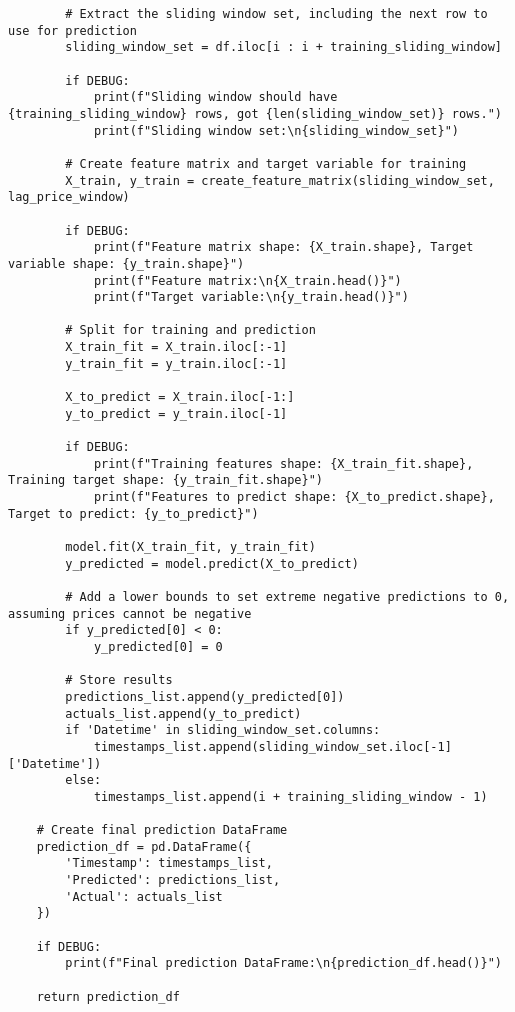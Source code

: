 \documentclass[12pt]{report} %
\begin{document}
\begin{lstlisting}
        # Extract the sliding window set, including the next row to use for prediction
        sliding_window_set = df.iloc[i : i + training_sliding_window]

        if DEBUG:
            print(f"Sliding window should have {training_sliding_window} rows, got {len(sliding_window_set)} rows.")
            print(f"Sliding window set:\n{sliding_window_set}")
        
        # Create feature matrix and target variable for training
        X_train, y_train = create_feature_matrix(sliding_window_set, lag_price_window)
        
        if DEBUG:
            print(f"Feature matrix shape: {X_train.shape}, Target variable shape: {y_train.shape}")
            print(f"Feature matrix:\n{X_train.head()}")
            print(f"Target variable:\n{y_train.head()}")

        # Split for training and prediction
        X_train_fit = X_train.iloc[:-1]
        y_train_fit = y_train.iloc[:-1]

        X_to_predict = X_train.iloc[-1:]
        y_to_predict = y_train.iloc[-1]

        if DEBUG:
            print(f"Training features shape: {X_train_fit.shape}, Training target shape: {y_train_fit.shape}")
            print(f"Features to predict shape: {X_to_predict.shape}, Target to predict: {y_to_predict}")

        model.fit(X_train_fit, y_train_fit)
        y_predicted = model.predict(X_to_predict)

        # Add a lower bounds to set extreme negative predictions to 0, assuming prices cannot be negative
        if y_predicted[0] < 0:
            y_predicted[0] = 0

        # Store results
        predictions_list.append(y_predicted[0])
        actuals_list.append(y_to_predict)
        if 'Datetime' in sliding_window_set.columns:
            timestamps_list.append(sliding_window_set.iloc[-1]['Datetime'])
        else:
            timestamps_list.append(i + training_sliding_window - 1)

    # Create final prediction DataFrame
    prediction_df = pd.DataFrame({
        'Timestamp': timestamps_list,
        'Predicted': predictions_list,
        'Actual': actuals_list
    })

    if DEBUG:
        print(f"Final prediction DataFrame:\n{prediction_df.head()}")

    return prediction_df
\end{lstlisting}
\end{document}

